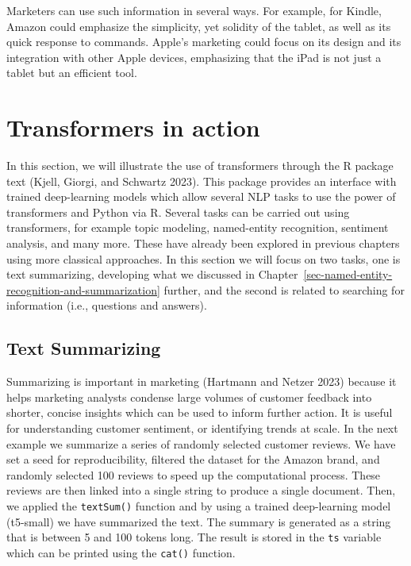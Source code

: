 Marketers can use such information in several ways. For example,
for Kindle, Amazon could emphasize the simplicity, yet solidity of the
tablet, as well as its quick response to commands. Apple's marketing
could focus on its design and its integration with other Apple devices,
emphasizing that the iPad is not just a tablet but an efficient tool.

\section{Transformers in action}\label{transformers-in-action}

In this section, we will illustrate the use of transformers through the R
package text (Kjell, Giorgi, and Schwartz 2023). This package
provides an interface with trained deep-learning models which allow
several NLP tasks to use the power of transformers and Python
via R. Several tasks can be carried out using transformers, for
example topic modeling, named-entity recognition, sentiment analysis,
and many more. These have already been explored in previous
chapters using more classical approaches. In this section we will
focus on two tasks, one is text summarizing, developing
what we discussed in
Chapter~\ref{sec-named-entity-recognition-and-summarization} further, and the
second is related to searching for information  (i.e., questions and
answers).

\subsection{Text Summarizing}\label{text-summarization}

Summarizing is important in marketing (Hartmann and Netzer 2023)
because it helps marketing analysts condense large volumes of
customer feedback into shorter, concise insights which can be used to inform further action. It is useful for understanding customer sentiment, or identifying
trends at scale. In the next example we summarize a series of
randomly selected customer reviews. We have set a seed for reproducibility, filtered the dataset for the Amazon brand, and randomly selected 100
reviews to speed up the computational process. These reviews
are then linked into a single string to produce a single
document. Then, we applied the \texttt{textSum()} function and by using a
trained deep-learning model (t5-small) we have summarized the text. The
summary is generated as a string that is between 5 and
100 tokens long. The result is stored in the \texttt{ts}
variable which can be printed using the \texttt{cat()} function.

